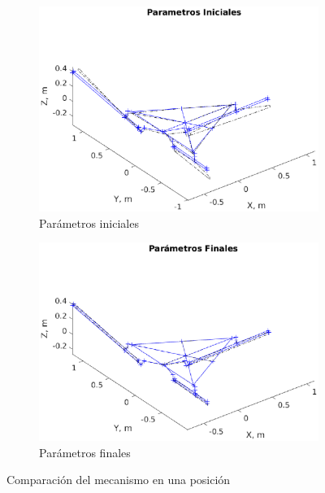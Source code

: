 \begin{figure}[hbt!]
    \centering
    \begin{subfigure}{0.45\textwidth}
        \includegraphics[width=\linewidth]{Cap4_DisenoBasico/Figura/ComparacionRigidez/ParametrosIniciales.eps}
        \caption{Parámetros iniciales}
    \end{subfigure}
    \begin{subfigure}{0.45\textwidth}
        \includegraphics[width=\linewidth]{Cap4_DisenoBasico/Figura/ComparacionRigidez/ParametrosFinales.eps}
        \caption{Parámetros finales}
    \end{subfigure}
    \caption{Comparación del mecanismo en una posición}
\end{figure}